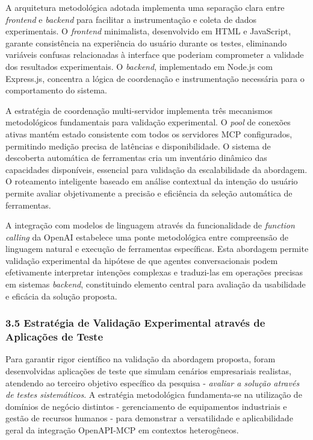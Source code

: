 \documentclass[
]{article}
\begin{document}
A arquitetura metodológica adotada implementa uma separação clara entre
\emph{frontend} e \emph{backend} para facilitar a instrumentação e
coleta de dados experimentais. O \emph{frontend} minimalista,
desenvolvido em HTML e JavaScript, garante consistência na experiência
do usuário durante os testes, eliminando variáveis confusas relacionadas
à interface que poderiam comprometer a validade dos resultados
experimentais. O \emph{backend}, implementado em Node.js com Express.js,
concentra a lógica de coordenação e instrumentação necessária para o
comportamento do sistema.

A estratégia de coordenação multi-servidor implementa três mecanismos
metodológicos fundamentais para validação experimental. O \emph{pool} de
conexões ativas mantém estado consistente com todos os servidores MCP
configurados, permitindo medição precisa de latências e disponibilidade.
O sistema de descoberta automática de ferramentas cria um inventário
dinâmico das capacidades disponíveis, essencial para validação da
escalabilidade da abordagem. O roteamento inteligente baseado em análise
contextual da intenção do usuário permite avaliar objetivamente a
precisão e eficiência da seleção automática de ferramentas.

A integração com modelos de linguagem através da funcionalidade de
\emph{function calling} da OpenAI estabelece uma ponte metodológica
entre compreensão de linguagem natural e execução de ferramentas
específicas. Esta abordagem permite validação experimental da hipótese
de que agentes conversacionais podem efetivamente interpretar intenções
complexas e traduzi-las em operações precisas em sistemas
\emph{backend}, constituindo elemento central para avaliação da
usabilidade e eficácia da solução proposta.

\subsubsection{3.5 Estratégia de Validação Experimental através de
Aplicações de
Teste}\label{estratuxe9gia-de-validauxe7uxe3o-experimental-atravuxe9s-de-aplicauxe7uxf5es-de-teste}

Para garantir rigor científico na validação da abordagem proposta, foram
desenvolvidas aplicações de teste que simulam cenários empresariais
realistas, atendendo ao terceiro objetivo específico da pesquisa -
\emph{avaliar a solução através de testes sistemáticos}. A estratégia
metodológica fundamenta-se na utilização de domínios de negócio
distintos - gerenciamento de equipamentos industriais e gestão de
recursos humanos - para demonstrar a versatilidade e aplicabilidade
geral da integração OpenAPI-MCP em contextos heterogêneos.
\end{document}
